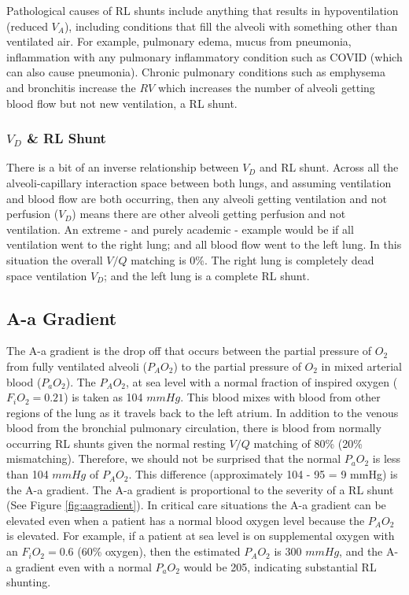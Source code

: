 Pathological causes of RL shunts include anything that results in hypoventilation (reduced $V_A$), including conditions that fill the alveoli with something other than ventilated air. For example, pulmonary edema, mucus from pneumonia, inflammation with any pulmonary inflammatory condition such as COVID (which can also cause pneumonia). Chronic pulmonary conditions such as emphysema and bronchitis increase the $RV$ which increases the number of alveoli getting blood flow but not new ventilation, a RL shunt.

\subsubsection{$V_D$ \& RL Shunt}

There is a bit of an inverse relationship between $V_D$ and RL shunt. Across all the alveoli-capillary interaction space between both lungs, and assuming ventilation and blood flow are both occurring, then any alveoli getting ventilation and not perfusion ($V_D$) means there are other alveoli getting perfusion and not ventilation. An extreme - and purely academic - example would be if all ventilation went to the right lung; and all blood flow went to the left lung. In this situation the overall $V/Q$ matching is 0\%. The right lung is completely dead space ventilation $V_D$; and the left lung is a complete RL shunt.


\subsection{A-a Gradient}

The A-a gradient is the drop off that occurs between the partial pressure of $O_2$ from fully ventilated alveoli ($P_AO_2$) to the partial pressure of $O_2$ in mixed arterial blood ($P_aO_2$). The $P_AO_2$, at sea level with a normal fraction of inspired oxygen ($F_iO_2 = 0.21$) is taken as 104 $mmHg$. This blood mixes with blood from other regions of the lung as it travels back to the left atrium. In addition to the venous blood from the bronchial pulmonary circulation, there is blood from normally occurring RL shunts given the normal resting $V/Q$ matching of 80\% (20\% mismatching). Therefore, we should not be surprised that the normal $P_aO_2$ is less than 104 $mmHg$ of $P_AO_2$. This difference (approximately 104 - 95 = 9 mmHg) is the A-a gradient. The A-a gradient is proportional to the severity of a RL shunt (See Figure \ref{fig:aagradient}). In critical care situations the A-a gradient can be elevated even when a patient has a normal blood oxygen level because the $P_AO_2$ is elevated. 
For example, if a patient at sea level is on supplemental oxygen with an $F_iO_2 = 0.6$ (60\% oxygen), then the estimated $P_AO_2$ is 300 $mmHg$, and the A-a gradient even with a normal $P_aO_2$ would be 205, indicating substantial RL shunting.

